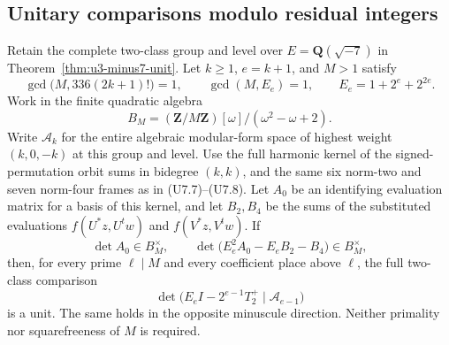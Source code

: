 \subsection{Unitary comparisons modulo residual integers}
\label{sec:u3-residual-ring}

\begin{lemma}\label{lem:u3-residual-ring}
Retain the complete two-class group and level over
$E=\mathbf Q(\sqrt{-7})$ in Theorem~\ref{thm:u3-minus7-unit}.
Let $k\ge1$, $e=k+1$, and $M>1$ satisfy
\[
 \gcd\bigl(M,336(2k+1)!\bigr)=1,
 \qquad \gcd(M,E_e)=1,
 \qquad E_e=1+2^e+2^{2e}.
 \tag{UR.1}
\]
Work in the finite quadratic algebra
\[
 B_M=(\mathbf Z/M\mathbf Z)[\omega]/(\omega^2-\omega+2).
 \tag{UR.2}
\]
Write $\mathcal A_k$ for the entire algebraic modular-form space
of highest weight $(k,0,-k)$ at this group and level.
Use the full harmonic kernel of the signed-permutation orbit sums
in bidegree $(k,k)$, and the same six norm-two and seven norm-four
frames as in (U7.7)--(U7.8). Let $A_0$ be an identifying evaluation
matrix for a basis of this kernel, and let $B_2,B_4$ be the sums of
the substituted evaluations $f(U^*z,U^tw)$ and $f(V^*z,V^tw)$.
If
\[
 \det A_0\in B_M^\times,
 \qquad
 \det\bigl(E_e^2A_0-E_eB_2-B_4\bigr)\in B_M^\times,
 \tag{UR.3}
\]
then, for every prime $\ell\mid M$ and every coefficient place
above $\ell$, the full two-class comparison
\[
 \det\bigl(E_e I-2^{e-1}T_2^+
       \mid\mathcal A_{e-1}\bigr)
 \tag{UR.4}
\]
is a unit. The same holds in the opposite minuscule direction.
Neither primality nor squarefreeness of $M$ is required.
\end{lemma}

